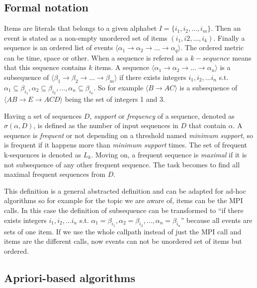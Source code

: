 \subsection{Formal notation}\label{ss:formal_notation}

Items are literals that belongs to a given alphabet $I=\{i_{1}, i_{2}, \dots,
i_{m}\}$. Then an event is stated as a non-empty unordered set of items
$(i_{1}, i{2}, \dots, i_{k})$. Finally a sequence is an ordered list of
events $\langle\alpha_{1} \rightarrow \alpha_{2} \rightarrow \dots \rightarrow
\alpha_{q}\rangle$. The ordered metric can be time, space or other. When a
sequence is refered as a $k-sequence$ means that this sequence contains $k$
items. A sequence $\langle\alpha_{1} \rightarrow \alpha_{2} \rightarrow \dots 
\rightarrow \alpha_{n}\rangle$ is a subsequence of $\langle\beta_{1} \rightarrow 
\beta_{2} \rightarrow \dots \rightarrow \beta_{m}\rangle$ if there exists
integers $i_{1}, i_{2}, \dots i_{n}$ s.t. $\alpha_{1} \subseteq \beta_{i_{1}}, 
\alpha_{2} \subseteq \beta_{i_{2}}, \dots, \alpha_{n} \subseteq \beta_{i_{n}}$.
So for example $\langle B \rightarrow AC\rangle$ is a subsequence of 
$\langle AB \rightarrow E \rightarrow ACD \rangle$ being the set of integers 1
and 3.

Having a set of sequences $D$, {\it support} or {\it frequency} of a sequence,
denoted as $\sigma(\alpha, D)$, is defined as the number of input sequences in $D$
that contain $\alpha$. A sequence is {\it frequent} or not depending on a
threshold named {\it minimum support}, so is frequent if it happens more than
{\it minimum support} times. The set of frequent k-sequences is denoted as
$L_{k}$. Moving on, a frequent sequence is {\it maximal} if it is not subsequence
of any other frequent sequence. The task becomes to find all maximal frequent
sequences from $D$.

This definition is a general abstracted definition and can be adapted for
ad-hoc algorithms so for example for the topic we are aware of, items can be the
MPI calls. In this case the
definition of subsequence can be transformed to “if there exists integers 
$i_{1}, i_{2}, \dots i_{n}$ s.t. $\alpha_{1} = \beta_{i_{1}}, 
\alpha_{2} = \beta_{i_{2}}, \dots, \alpha_{n} = \beta_{i_{n}}$” because all
events are sets of one item. If we use the whole callpath instead of just the
MPI call and items are the different calls, now events can not be unordered set
of items but ordered. 

\subsection{Apriori-based algorithms}\label{ss:apriori_based}


